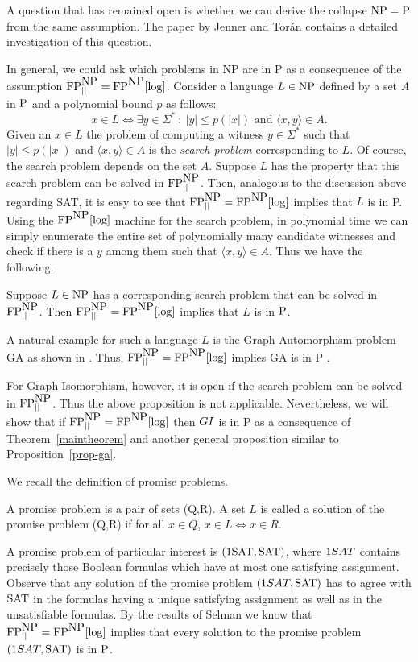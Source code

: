 \documentclass{elsart}
\newcommand{\p}{\mbox{\rm P}}
\newcommand{\NP}{\mbox{\rm NP}}
\newcommand{\FP}{\mbox{\rm FP}}
\newcommand{\GI}{{\rm{GI}}}
\newcommand{\SAT}{\mbox{\rm SAT}}
\newcommand{\oneSAT}{\ensuremath{\rm 1SAT}}
\renewcommand{\angle}[1]{\langle #1\rangle}
\begin{document}
A question that has remained open is whether we can derive the
collapse $\NP=\p$ from the same assumption. The paper by Jenner and
Tor\'an \cite{JT95} contains a detailed investigation of this
question. 

In general, we could ask which problems in NP are in P as a
consequence of the assumption $\FP^{\NP}_{||}=\FP^{\NP}[\log]$.
Consider a language $L\in\NP$ defined by a set $A$ in $\p$ and a
polynomial bound $p$ as follows:
\[
x\in L \iff \exists y\in \Sigma^*~:~ |y|\leq p(|x|) \textrm{ and }
\angle{x,y}\in A.
\]
Given an $x\in L$ the problem of computing a witness $y\in\Sigma^*$
such that $|y|\leq p(|x|)$ and $\angle{x,y}\in A$ is the \emph{search
  problem} corresponding to $L$. Of course, the search problem depends
on the set $A$. Suppose $L$ has the property that this search problem
can be solved in $\FP^{\NP}_{||}$. Then, analogous to the discussion
above regarding SAT, it is easy to see that
$\FP^{\NP}_{||}=\FP^{\NP}[\log]$ implies that $L$ is in P. Using the
$\FP^{\NP}[\log]$ machine for the search problem, in polynomial time
we can simply enumerate the entire set of polynomially many candidate
witnesses and check if there is a $y$ among them such that
$\angle{x,y}\in A$. Thus we have the following.
\begin{prop}\label{prop-ga}
  Suppose $L\in\NP$ has a corresponding search problem that can be
  solved in $\FP^{\NP}_{||}$. Then $\FP^{\NP}_{||}=\FP^{\NP}[\log]$
  implies that $L$ is in $\p$.
\end{prop}
A natural example for such a language $L$ is the Graph Automorphism
problem GA as shown in \cite{LT92}. Thus,
$\FP^{\NP}_{||}=\FP^{\NP}[\log]$ implies GA is in P \cite{LT92}.

For Graph Isomorphism, however, it is open if the search problem can
be solved in $\FP^{\NP}_{||}$. Thus the above proposition is not
applicable. Nevertheless, we will show that if
$\FP^{\NP}_{||}=\FP^{\NP}[\log]$ then $\GI$ is in P as a consequence
of Theorem~\ref{maintheorem} and another general proposition similar
to Proposition~\ref{prop-ga}.

We recall the definition of promise problems.

\begin{defn}{\rm\cite{ESY84}}
A promise problem is a pair of sets (Q,R). A set $L$ is
called a solution of the promise problem (Q,R) if for
all $x\in Q$, $x\in L \Leftrightarrow x\in R$.
\end{defn}
 
A promise problem of particular interest is $(1\SAT,\SAT)$, where
$\oneSAT$ contains precisely those Boolean formulas which have at most
one satisfying assignment. Observe that any solution of the promise
problem $(\oneSAT,\SAT)$ has to agree with $\SAT$ in the formulas
having a unique satisfying assignment as well as in the unsatisfiable
formulas. By the results of Selman \cite{S94,ESY84} we know that
$\FP^{\NP}_{||}=\FP^{\NP}[\log]$ implies that every solution to the
promise problem $(\oneSAT,\SAT)$ is in $\p$. 
\end{document}
